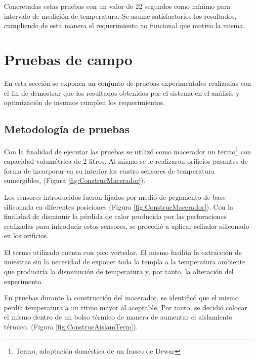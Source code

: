 \par
Concretadas estas pruebas con un valor de 22 segundos como mínimo para intervalo de medición de temperatura. Se asume satisfactorios los resultados, cumpliendo de esta manera el requerimiento no funcional que motivo la misma.


\section{Pruebas de campo}
\par En esta sección se exponen un conjunto de pruebas experimentales realizadas con el fin de demostrar que los resultados obtenidos por el sistema en el análisis y optimización de insumos cumplen los requerimientos. 

    \subsection{Metodología de pruebas}
        \par Con la finalidad de ejecutar las pruebas se utilizó como macerador un termo\footnote{Termo, adaptación doméstica de un frasco de Dewar} con capacidad volumétrica de 2 litros. Al mismo se le realizaron orificios pasantes de forma de incorporar en su interior los cuatro sensores de temperatura sumergibles, (Figura \ref{fig:ConstrucMacerador}).
        
        \par Los sensores introducidos fueron fijados por medio de pegamento de base siliconada en diferentes posiciones (Figura \ref{fig:ConstrucMacerador}). Con la finalidad de disminuir la pérdida de calor producida por las perforaciones realizadas para introducir estos sensores, se procedió a aplicar sellador siliconado  en los orificios.
        
        \par El termo utilizado cuenta con pico vertedor. El mismo facilita la extracción de muestras sin la necesidad de exponer toda la templa a la temperatura ambiente que produciría la disminución de temperatura y, por tanto, la alteración del experimento.
        
        \par En pruebas durante la construcción del macerador, se identificó que el mismo perdía temperatura a un ritmo mayor al aceptable. Por tanto, se decidió colocar el mismo dentro de un bolso térmico de manera de aumentar el aislamiento térmico. (Figura \ref{fig:ConstrucAislamTerm}).
        
